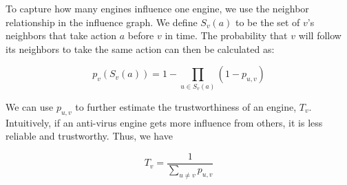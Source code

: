 To capture how many engines influence one engine, we use the neighbor relationship in the influence graph. 
We define $S_v(a)$ to be the set of $v$'s neighbors that take action $a$ before $v$ in time. 
The probability that $v$ will follow its neighbors to take the same action can then be calculated as:


\begin{equation} \label{eq:setp}
p_v(S_v(a)) = 1 - \prod\limits_{u \in S_v(a)}(1 - p_{u,v})
\end{equation}

We can use $p_{u,v}$ to further estimate the trustworthiness of an engine, $T_v$.
Intuitively, if an anti-virus engine gets more influence from others,
it is less reliable and trustworthy. Thus, we have

\begin{equation} \label{eq:trust}
T_v = \frac{1}{\sum\limits_{u \neq v}{p_{u,v}}}
\end{equation}
